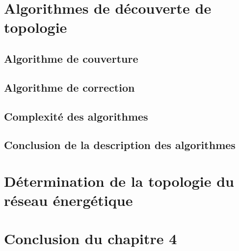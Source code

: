 \section{Algorithmes de d\'ecouverte de topologie}

	
	
	\subsection{Algorithme de couverture}
		\label{algoCouverture}
		
		
	\subsection{Algorithme de correction}
		

	\subsection{Complexit\'e des algorithmes}
		

	\subsection{Conclusion de la description des algorithmes}
		

\section{D\'etermination de la topologie du r\'eseau \'energ\'etique}
	
		
\section{Conclusion du chapitre 4 }
	 
